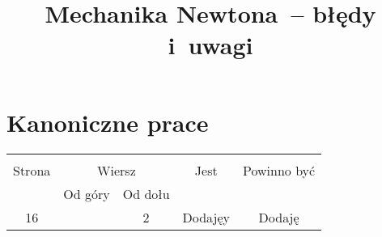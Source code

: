 \documentclass[a4paper,11pt]{article}
\title{Mechanika Newtona~-- błędy i~uwagi}
\begin{document}





\maketitle %





\section{Kanoniczne prace}

\vspace{\spaceThree}







\begin{center}

  \begin{tabular}{|c|c|c|c|c|}
    \hline
    & \multicolumn{2}{c|}{} & & \\
    Strona & \multicolumn{2}{c|}{Wiersz} & Jest
                              & Powinno być \\ \cline{2-3}
    & Od góry & Od dołu & & \\
    \hline
    16  & &  2 & Dodajęy & Dodaję \\
    \hline
  \end{tabular}

\end{center}


\vspace{\spaceTwo}
\end{document}
